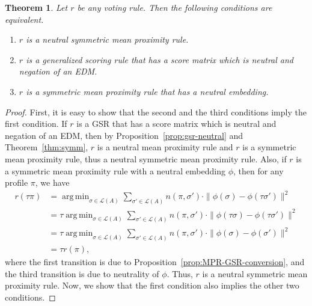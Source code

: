 \documentclass[10pt,letterpaper]{article}
\newcommand{\calL}{{\mathcal{L}}}
\newcommand{\rank}{{\calL(A)}}
\DeclareMathOperator*{\argmin}{arg\,min}
\newtheorem{theorem}{Theorem}
\begin{document}
\begin{theorem}
Let $r$ be any voting rule. Then the following conditions are equivalent.
\begin{enumerate}
\item $r$ is a neutral symmetric mean proximity rule.
\item $r$ is a generalized scoring rule that has a score matrix which is neutral and negation of an EDM. 
\item $r$ is a symmetric mean proximity rule that has a neutral embedding.
\end{enumerate}
\label{thm:neutral-smpr}
\end{theorem}
\begin{proof}
First, it is easy to show that the second and the third conditions imply the first condition. If $r$ is a GSR that has a score matrix which is neutral and negation of an EDM, then by Proposition~\ref{prop:gsr-neutral} and Theorem~\ref{thm:symm}, $r$ is a neutral mean proximity rule and $r$ is a symmetric mean proximity rule, thus a neutral symmetric mean proximity rule. Also, if $r$ is a symmetric mean proximity rule with a neutral embedding $\phi$, then for any profile $\pi$, we have 
\begin{align*}
r(\tau \pi) &= \argmin_{\sigma \in \rank} \sum_{\sigma' \in \rank} n(\pi,\sigma') \cdot \|\phi(\sigma)-\phi(\tau \sigma')\|^2 \\
&= \tau \argmin_{\sigma \in \rank} \sum_{\sigma' \in \rank} n(\pi,\sigma') \cdot \|\phi(\tau \sigma)-\phi(\tau \sigma')\|^2 \\
&= \tau \argmin_{\sigma \in \rank} \sum_{\sigma' \in \rank} n(\pi,\sigma') \cdot \|\phi(\sigma)-\phi(\sigma')\|^2 \\
&= \tau r(\pi),
\end{align*}
where the first transition is due to Proposition~\ref{prop:MPR-GSR-conversion}, and the third transition is due to neutrality of $\phi$. Thus, $r$ is a neutral symmetric mean proximity rule. Now, we show that the first condition also implies the other two conditions.


\end{proof}
\end{document}
